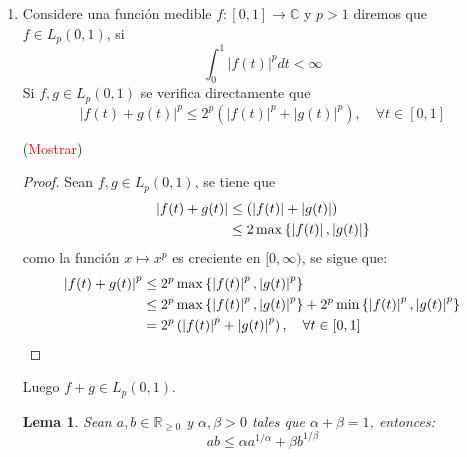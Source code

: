 \documentclass[twoside,12pt,a4 paper,openright]{book}
\newtheorem{lem}[claim]{Lema}
\begin{document}
    \begin{enumerate}
    \item Considere una funci\'on medible $f:[0,1]\to \mathbb C$ y $p>1$ diremos que $f\in L_p(0,1)$, si
    \begin{equation*}
        \int_{0}^1 |f(t)|^p dt < \infty
    \end{equation*}
    Si $f,g\in L_p(0,1)$ se verifica directamente que 
    \begin{equation*}
        |f(t) + g(t)|^p \leq 2^p (|f(t) |^p + | g(t)|^p) , \quad \forall  t\in [0,1]
    \end{equation*}

    (\textcolor{red}{Mostrar})

    \begin{proof}
        Sean $f,g\in L_p(0,1)$, se tiene que
        \begin{equation*}
            \begin{split}
                \left|f(t)+g(t)\right|&\leq(\left|f(t)\right|+\left|g(t)\right|)\\
                &\leq2\max\left\{\left|f(t)\right|,\left|g(t)\right|\right\}\\
            \end{split}
        \end{equation*}
        como la funci\'on $x\mapsto x^p$ es creciente en $[0,\infty)$, se sigue que:
        \begin{equation*}
            \begin{split}
                \left|f(t)+g(t)\right|^p&\leq 2^p\max\left\{\left|f(t)\right|^p,\left|g(t)\right|^p\right\}\\
                &\leq 2^p\max\left\{\left|f(t)\right|^p,\left|g(t)\right|^p\right\}+2^p\min\left\{\left|f(t)\right|^p,\left|g(t)\right|^p\right\}\\
                &=2^p\left(\left|f(t)\right|^p+\left|g(t)\right|^p\right),\quad\forall t\in[0,1] \\
            \end{split}
        \end{equation*}
    \end{proof}
    Luego $f+g\in L_p(0,1)$.

    \begin{lem}
        Sean $a,b\in\mathbb{R}_{\geq0}$ y $\alpha,\beta>0$ tales que $\alpha+\beta=1$, entonces:
        \begin{equation*}
            ab\leq \alpha a^{1/\alpha}+\beta b^{1/\beta}
        \end{equation*}
    \end{lem}


\end{enumerate}
\end{document}
